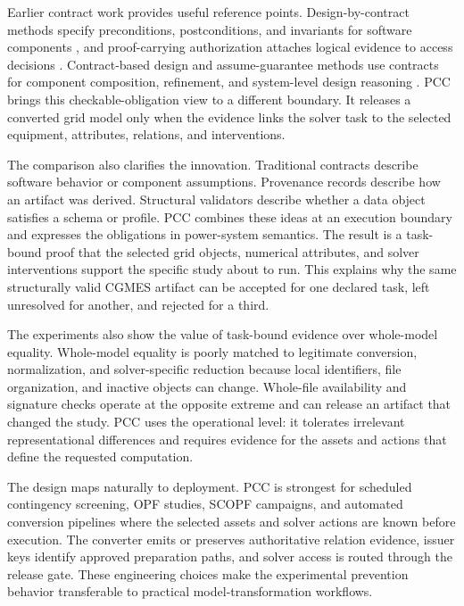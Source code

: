 \documentclass[preprint,12pt]{elsarticle}
\begin{document}
Earlier contract work provides useful reference points. Design-by-contract methods specify preconditions, postconditions, and invariants for software components \citep{meyer1992dbc}, and proof-carrying authorization attaches logical evidence to access decisions \citep{appel1999pca}. Contract-based design and assume-guarantee methods use contracts for component composition, refinement, and system-level design reasoning \citep{sangiovanni2012contract,benveniste2018contracts}. PCC brings this checkable-obligation view to a different boundary. It releases a converted grid model only when the evidence links the solver task to the selected equipment, attributes, relations, and interventions.

The comparison also clarifies the innovation. Traditional contracts describe software behavior or component assumptions. Provenance records describe how an artifact was derived. Structural validators describe whether a data object satisfies a schema or profile. PCC combines these ideas at an execution boundary and expresses the obligations in power-system semantics. The result is a task-bound proof that the selected grid objects, numerical attributes, and solver interventions support the specific study about to run. This explains why the same structurally valid CGMES artifact can be accepted for one declared task, left unresolved for another, and rejected for a third.

The experiments also show the value of task-bound evidence over whole-model equality. Whole-model equality is poorly matched to legitimate conversion, normalization, and solver-specific reduction because local identifiers, file organization, and inactive objects can change. Whole-file availability and signature checks operate at the opposite extreme and can release an artifact that changed the study. PCC uses the operational level: it tolerates irrelevant representational differences and requires evidence for the assets and actions that define the requested computation.

The design maps naturally to deployment. PCC is strongest for scheduled contingency screening, OPF studies, SCOPF campaigns, and automated conversion pipelines where the selected assets and solver actions are known before execution. The converter emits or preserves authoritative relation evidence, issuer keys identify approved preparation paths, and solver access is routed through the release gate. These engineering choices make the experimental prevention behavior transferable to practical model-transformation workflows.
\end{document}
